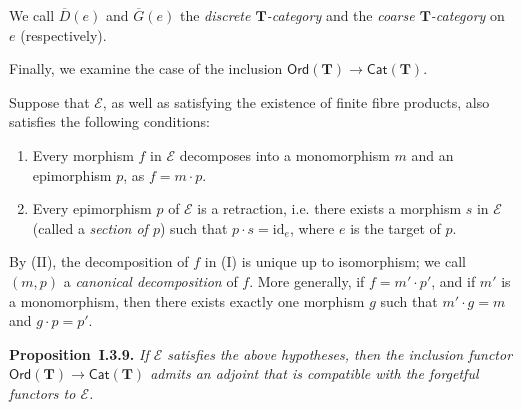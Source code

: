 \documentclass{article}
\newenvironment{itenv}[1]
  {\phantomsection\par\medskip\noindent\textbf{#1.}\itshape}
  {\par\medskip}
\newcommand{\oldpage}[1]{\marginpar{\footnotesize$\Big\vert$ \textit{p.~#1}}}
\newcommand{\id}{\mathrm{id}}
\newcommand{\TT}{\mathbf{T}}
\newcommand{\cat}[1]{\mathcal{#1}}
\newcommand{\Cat}[1]{\mathsf{#1}}
\newcommand{\Ord}[1]{\Cat{Ord}(#1)}
\begin{document}
\oldpage{239}
We call $\overline{D}(e)$ and $\overline{G}(e)$ the \emph{discrete $\TT$-category} and the \emph{coarse $\TT$-category} on $e$ (respectively).

Finally, we examine the case of the inclusion $\Ord{\TT}\to\Cat{Cat}(\TT)$.

Suppose that $\cat{E}$, as well as satisfying the existence of finite fibre products, also satisfies the following conditions:

\begin{enumerate}
  \item[(I)] Every morphism $f$ in $\cat{E}$ decomposes into a monomorphism $m$ and an epimorphism $p$, as $f=m\cdot p$.
  \item[(II)] Every epimorphism $p$ of $\cat{E}$ is a retraction, i.e. there exists a morphism $s$ in $\cat{E}$ (called a \emph{section of $p$}) such that $p\cdot s=\id_e$, where $e$ is the target of $p$.
\end{enumerate}

By (II), the decomposition of $f$ in (I) is unique up to isomorphism;
we call $(m,p)$ a \emph{canonical decomposition} of $f$.
More generally, if $f=m'\cdot p'$, and if $m'$ is a monomorphism, then there exists exactly one morphism $g$ such that $m'\cdot g=m$ and $g\cdot p=p'$.

\begin{itenv}{Proposition~I.3.9}
  If $\cat{E}$ satisfies the above hypotheses, then the inclusion functor $\Ord{\TT}\to\Cat{Cat}(\TT)$ admits an adjoint that is compatible with the forgetful functors to $\cat{E}$.
\end{itenv}
\end{document}
